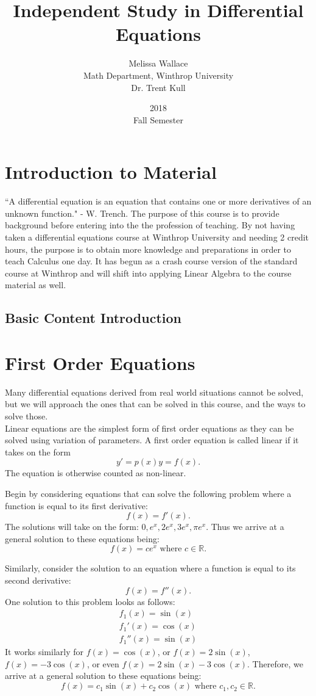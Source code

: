 \documentclass[10pt]{article}
\title{Independent Study in Differential Equations}
\date{2018\\Fall Semester}
\author{Melissa Wallace\\Math Department, Winthrop University\\Dr. Trent Kull}
\begin{document}
\maketitle

\section{Introduction to Material}
    ``A differential equation is an equation that contains one or more derivatives of an unknown function." - W. Trench. %
    The purpose of this course is to provide background before entering into the the profession of teaching. By not having taken a differential equations course at Winthrop University and needing 2 credit hours, the purpose is to obtain more knowledge and preparations in order to teach Calculus one day. %
    It has begun as a crash course version of the standard course at Winthrop and will shift into applying Linear Algebra to the course material as well.
    
    \subsection{Basic Content Introduction}
        
    
\section{First Order Equations}
    Many differential equations derived from real world situations cannot be solved, but we will approach the ones that can be solved in this course, and the ways to solve those.\\
    
    Linear equations are the simplest form of first order equations as they can be solved using variation of parameters. A first order equation is called linear if it takes on the form $$y'=p(x)y=f(x).$$ The equation is otherwise counted as non-linear. 
    
    Begin by considering equations that can solve the following problem where a function is equal to its first derivative: $$f(x)=f'(x).$$
    The solutions will take on the form: $0, e^x, 2e^x, 3e^x, \pi e^x$. Thus we arrive at a general solution to these equations being: $$f(x)=ce^x \text{ where } c\in\mathbb{R}.$$
    
    Similarly, consider the solution to an equation where a function is equal to its second derivative: $$f(x)=f''(x).$$
    One solution to this problem looks as follows:
    \begin{eqnarray*}
        f_1(x)=\sin(x)\\
        f_1'(x)=\cos(x)\\
        f_1''(x)=\sin(x)
    \end{eqnarray*}
    It works similarly for $f(x)=\cos(x)$, or $f(x)=2\sin(x)$, $f(x)=-3\cos(x)$, or even $f(x)=2\sin(x)-3\cos(x)$. Therefore, we arrive at a general solution to these equations being: $$f(x)=c_1\sin(x)+c_2\cos(x) \text{ where } c_1,c_2\in\mathbb{R}.$$
    \\
    
\end{document}
